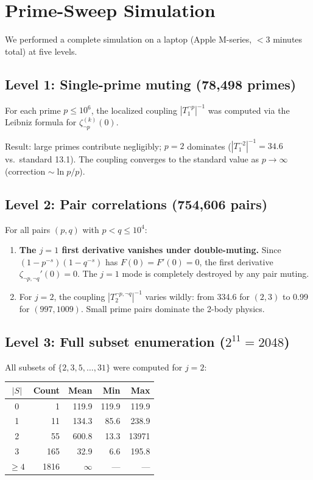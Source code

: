 \documentclass[aps,prd,twocolumn,superscriptaddress,nofootinbib]{revtex4-2}
\begin{document}
\section{Prime-Sweep Simulation}\label{sec:sweep}

We performed a complete simulation on a laptop (Apple M-series,
$<3$ minutes total) at five levels.

\subsection{Level 1: Single-prime muting (78,498 primes)}

For each prime $p\leq 10^6$, the localized coupling
$|T_1^{\neg p}|^{-1}$ was computed via the Leibniz formula
for $\zeta_{\neg p}^{(k)}(0)$.

Result: large primes contribute negligibly; $p=2$ dominates
($|T_1^{\neg 2}|^{-1}=34.6$ vs.\ standard 13.1).
The coupling converges to the standard value as
$p\to\infty$ (correction $\sim\ln p/p$).

\subsection{Level 2: Pair correlations (754,606 pairs)}

For all pairs $(p,q)$ with $p<q\leq 10^4$:

\begin{enumerate}
\item \textbf{The $j=1$ first derivative vanishes under double-muting.}
Since $(1-p^{-s})(1-q^{-s})$ has $F(0)=F'(0)=0$,
the first derivative $\zeta_{\neg p,\neg q}'(0)=0$.
The $j=1$ mode is completely destroyed by any pair muting.

\item For $j=2$, the coupling $|T_2^{\neg p,\neg q}|^{-1}$ varies
wildly: from 334.6 for $(2,3)$ to 0.99 for $(997,1009)$.
Small prime pairs dominate the 2-body physics.
\end{enumerate}

\subsection{Level 3: Full subset enumeration ($2^{11}=2048$)}

All subsets of $\{2,3,5,\ldots,31\}$ were computed for $j=2$:

\begin{center}
\begin{tabular}{crrrr}
\toprule
$|S|$ & Count & Mean & Min & Max \\
\midrule
0 & 1 & 119.9 & 119.9 & 119.9 \\
1 & 11 & 134.3 & 85.6 & 238.9 \\
2 & 55 & 600.8 & 13.3 & 13971 \\
3 & 165 & 32.9 & 6.6 & 195.8 \\
$\geq 4$ & 1816 & $\infty$ & --- & --- \\
\bottomrule
\end{tabular}
\end{center}
\end{document}
